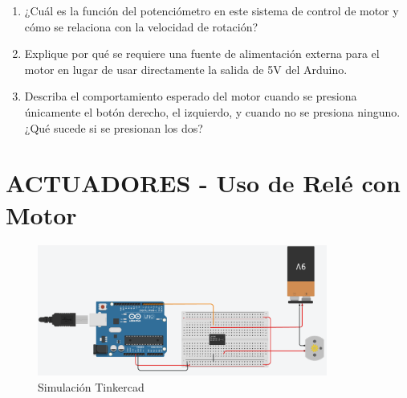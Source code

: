 \begin{enumerate}
    \item ¿Cuál es la función del potenciómetro en este sistema de control de motor y cómo se
    relaciona con la velocidad de rotación?
    \item Explique por qué se requiere una fuente de alimentación externa para el motor en lugar de usar directamente la salida de 5V del Arduino.
    \item Describa el comportamiento esperado del motor cuando se presiona únicamente el botón
    derecho, el izquierdo, y cuando no se presiona ninguno. ¿Qué sucede si se presionan los dos?
\end{enumerate}



\section{ACTUADORES - Uso de Relé con Motor}

\begin{figure}[H]
    \centering
    \includegraphics[width=0.85\textwidth]{./img/ckpt_rele_motor.png}
    \caption{Simulación Tinkercad}
    \label{fig:motor_driver}
\end{figure}


